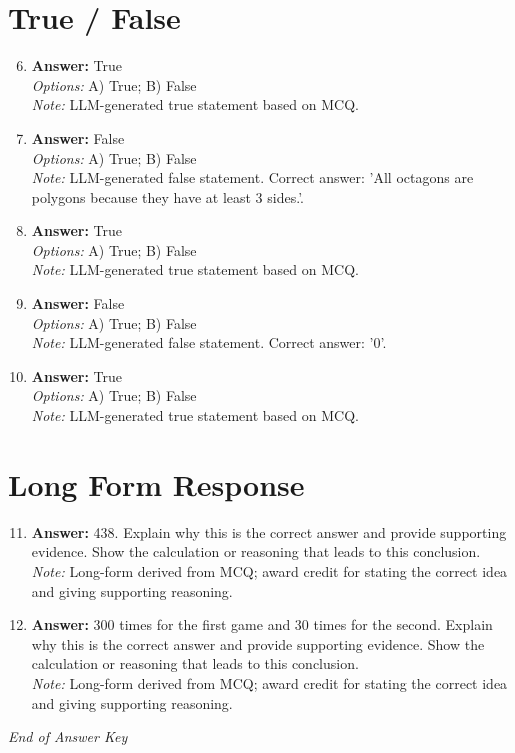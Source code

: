 \documentclass[12pt]{article}
\begin{document}
\section*{True / False}
\begin{enumerate}[label=\arabic*.]
\setcounter{enumi}{5}
\item \textbf{Answer:} True
\\ \textit{Options:} A) True; B) False
\\ \textit{Note:} LLM-generated true statement based on MCQ.
\item \textbf{Answer:} False
\\ \textit{Options:} A) True; B) False
\\ \textit{Note:} LLM-generated false statement. Correct answer: 'All octagons are polygons because they have at least 3 sides.'.
\item \textbf{Answer:} True
\\ \textit{Options:} A) True; B) False
\\ \textit{Note:} LLM-generated true statement based on MCQ.
\item \textbf{Answer:} False
\\ \textit{Options:} A) True; B) False
\\ \textit{Note:} LLM-generated false statement. Correct answer: '0'.
\item \textbf{Answer:} True
\\ \textit{Options:} A) True; B) False
\\ \textit{Note:} LLM-generated true statement based on MCQ.
\end{enumerate}

\section*{Long Form Response}
\begin{enumerate}[label=\arabic*.]
\setcounter{enumi}{10}
\item \textbf{Answer:} 438. Explain why this is the correct answer and provide supporting evidence. Show the calculation or reasoning that leads to this conclusion.
\\ \textit{Note:} Long-form derived from MCQ; award credit for stating the correct idea and giving supporting reasoning.
\item \textbf{Answer:} 300 times for the first game and 30 times for the second. Explain why this is the correct answer and provide supporting evidence. Show the calculation or reasoning that leads to this conclusion.
\\ \textit{Note:} Long-form derived from MCQ; award credit for stating the correct idea and giving supporting reasoning.
\end{enumerate}

\vfill
\noindent\textit{End of Answer Key}
\end{document}
